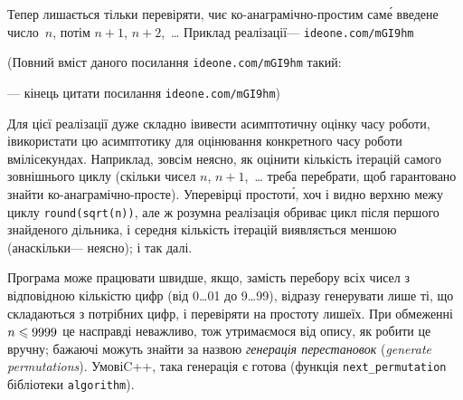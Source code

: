 \documentclass[14pt,a4paper]{extarticle}
\renewcommand{\baselinestretch}{1.3125}
\begin{document}
Тепер лишається тільки перевіряти, чи\nolinebreak[3] є ко-ана\-гра\-мічно-простим сам\'{е} введене число~$n$, потім $n{+}1$, $n{+}2$,~\dots{} Приклад реалізації\nolinebreak[3] --- 
\verb"ideone.com/mGI9hm"


{\color{green}\begin{small}

\renewcommand{\baselinestretch}{0.875}

(Повний вміст даного посилання \verb"ideone.com/mGI9hm" такий:

--- кінець цитати посилання \verb"ideone.com/mGI9hm")

\end{small}}




Для цієї реалізації дуже складно і\nolinebreak[3] вивести асимптотичну оцінку часу роботи, і\nolinebreak[3] використати цю асимптотику для оцінювання конкретного часу роботи в\nolinebreak[3] мілісекундах. Наприклад, зовсім не\nolinebreak[3] ясно, як оцінити кількість ітерацій самого зовнішнього циклу (скільки чисел $n$, $n{+}1$,~\dots{} треба перебрати, щоб гарантовано знайти ко-ана\-гра\-мічно-просте). У\nolinebreak[3] перевірці простот\'{и}, хоч і видно верхню межу циклу \verb"round(sqrt(n))", але ж розумна реалізація обриває цикл після першого знайденого дільника, і середня кількість ітерацій виявляється меншою (а\nolinebreak[3] наскільки\nolinebreak[3] --- не\nolinebreak[3] ясно); і так далі.

Програма може працювати швидше, якщо, замість перебору всіх чисел з відповідною кількістю цифр (від 0\dots01 до 9\dots99), відразу генерувати лише ті, що складаються з потрібних цифр, і перевіряти на простоту лише\nolinebreak[3] їх. При обмеженні $n\leqslant9999$ це насправді неважливо, тож утримаємося від опису, як робити це вручну; бажаючі можуть знайти за назвою \emph{генерація перестановок} (\emph{generate permutations}). У\nolinebreak[3] мові\nolinebreak[2] C++, така генерація є готова (функція \verb"next_permutation" бібліотеки \verb"algorithm").
\end{document}
